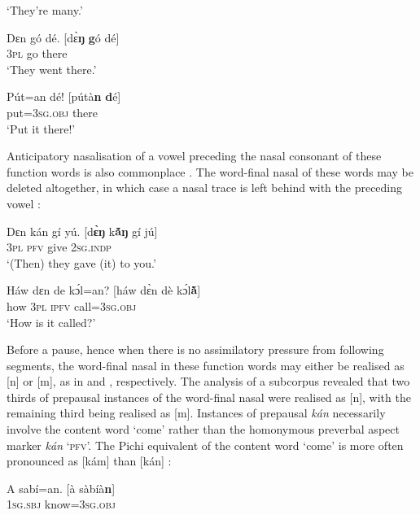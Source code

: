 \glt ‘They’re many.’
\z


\ea%
    \label{ex:key:28}
    \gll   Dɛn    gó  dé.            \textup{[dɛ̀\textbf{ŋ}    \textbf{g}ó  dé]}\\
\textsc{3pl}    go  there\\
\glt ‘They went there.’
\z


\ea%
    \label{ex:key:29}
    \gll   Pút=an    dé!            \textup{[pútà\textbf{n}  \textbf{d}é]}\\
put=\textsc{3sg.obj}  there\\

\glt ‘Put it there!’
\z

Anticipatory nasalisation of a vowel preceding the nasal consonant of these function words is also commonplace . The word-final nasal of these words may be deleted altogether, in which case a nasal trace is left behind with the preceding vowel :


\ea%
    \label{ex:key:30}
    \gll   Dɛn    kán    gí    yú.      \textup{[d\textbf{ɛ̀ŋ}    k\textbf{ã́ŋ}    gí  jú]}\\
\textsc{3pl}    \textsc{pfv}    give    \textsc{2sg.indp}\\

\glt ‘(Then) they gave (it) to you.’
\z


\ea%
    \label{ex:key:31}
    \gll   Háw    dɛn  de  kɔ́l=an?       \textup{[háw  dɛ̀n  dè  kɔ́l\textbf{ã̀}]}\\
how    \textsc{3pl}  \textsc{ipfv}  call=\textsc{3sg.obj}\\

\glt ‘How is it called?’
\z

Before a pause, hence when there is no assimilatory pressure from following segments, the word-final nasal in these function words may either be realised as [n] or [m], as in  and , respectively. The analysis of a subcorpus revealed that two thirds of prepausal instances of the word-final nasal were realised as [n], with the remaining third being realised as [m]. Instances of prepausal \textit{kán} necessarily involve the content word ‘come’ rather than the homonymous preverbal aspect marker \textit{kán} ‘\textsc{pfv}’. The Pichi equivalent of the content word ‘come’ is more often pronounced as [kám] than [kán] :


\ea%
    \label{ex:key:32}
    \gll   A    sabí=an.            \textup{[à  sàbíà\textbf{n}]}\\
\textsc{1sg.sbj}  know=\textsc{3sg.obj}\\


